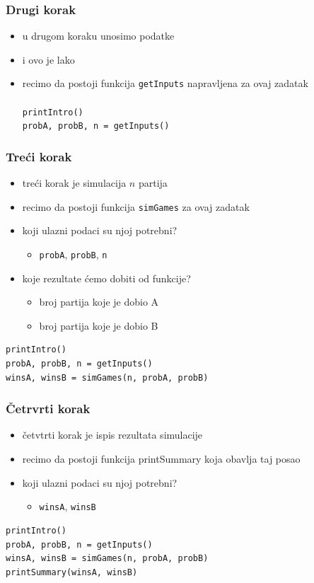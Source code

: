 \documentclass[utf8,compress]{beamer}
\begin{document}
\begin{frame}
  \frametitle{Drugi korak}
  \begin{itemize}
    \item u drugom koraku unosimo podatke
    \item i ovo je lako
    \item recimo da postoji funkcija \texttt{getInputs} napravljena za ovaj zadatak \\ \ \\
      \texttt{printIntro()} \\
      \texttt{probA, probB, n = getInputs()}
  \end{itemize}
\end{frame}

\begin{frame}[fragile]
  \frametitle{Treći korak}
  \begin{itemize}
    \item treći korak je simulacija $n$ partija
    \item recimo da postoji funkcija \texttt{simGames} za ovaj zadatak
    \item koji ulazni podaci su njoj potrebni?
    \begin{itemize}
      \item \texttt{probA}, \texttt{probB}, \texttt{n}
    \end{itemize}
    \item koje rezultate ćemo dobiti od funkcije?
    \begin{itemize}
      \item broj partija koje je dobio A
      \item broj partija koje je dobio B
    \end{itemize}
  \end{itemize}
\begin{verbatim}
printIntro()
probA, probB, n = getInputs()
winsA, winsB = simGames(n, probA, probB)
\end{verbatim}
\end{frame}

\begin{frame}[fragile]
  \frametitle{Četrvrti korak}
  \begin{itemize}
    \item četvtrti korak je ispis rezultata simulacije
    \item recimo da postoji funkcija printSummary koja obavlja taj posao
    \item koji ulazni podaci su njoj potrebni?
    \begin{itemize}
      \item \texttt{winsA}, \texttt{winsB}
    \end{itemize}
  \end{itemize}
\begin{verbatim}
printIntro()
probA, probB, n = getInputs()
winsA, winsB = simGames(n, probA, probB)
printSummary(winsA, winsB)
\end{verbatim}
\end{frame}
\end{document}
